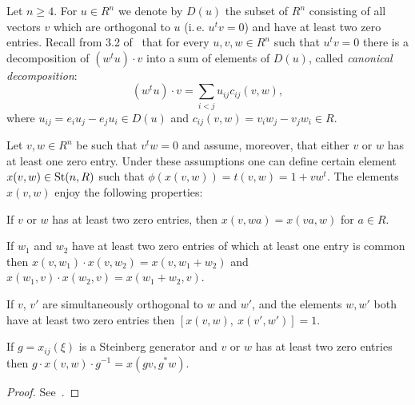 Let $n \geq 4$.
For $u \in R^n$ we denote by $D(u)$ the subset of $R^n$ consisting of all vectors $v$ which are orthogonal to $u$
(i.\,e. $u^{t} v = 0$) and have at least two zero entries.
Recall from 3.2 of~\cite{Ka77} that for every $u, v, w \in R^n$ such that $u^t v = 0$ there
is a decomposition of $(w^t u) \cdot v$ into a sum of elements of $D(u)$, called \textit{canonical decomposition}:
\begin{equation}
    \label{eq:canonical} (w^tu) \cdot v=\sum_{i<j}u_{ij} c_{ij}(v, w),
\end{equation}
where $u_{ij} =e_i u_j-e_j u_i \in D(u)$ and $c_{ij}(v, w) =v_i w_j-v_j w_i \in R$.

\begin{lemma}
    \label{lem:xsmall-properties}
    Let $v, w \in R^n$ be such that $v^t w = 0$ and assume, moreover, that either $v$ or $w$ has at least one zero entry.
    Under these assumptions one can define certain element $x(v, w) \in \operatorname{St}(n, R)$ such that $\phi(x(v, w)) = t(v, w) = 1 + vw^t$.
    The elements $x(v, w)$ enjoy the following properties:
    \begin{lemlist}
        \item \label{itm:xsmall-scalar} If $v$ or $w$ has at least two zero entries, then $x(v, wa) = x(va, w)$ for $a\in R$.
        \item \label{itm:xsmall-additivity} If $w_1$ and $w_2$ have at least two zero entries of which at least one entry is common
        then $x(v, w_1) \cdot x(v, w_2) = x(v, w_1+w_2)$ and $x(w_1, v) \cdot x(w_2, v) = x(w_1 + w_2, v)$.
        \item \label{itm:xsmall-commute} If $v$, $v'$ are simultaneously orthogonal to $w$ and $w'$, and the elements $w, w'$ both have at least two zero entries then
        $[x(v, w),\ x(v', w')] = 1$.
        \item \label{itm:xsmall-conj} If $g = x_{ij}(\xi)$ is a Steinberg generator and $v$ or $w$ has at least two zero entries then
        $g \cdot x(v, w) \cdot g^{-1} = x(gv, g^*w)$.
    \end{lemlist}
\end{lemma}
\begin{proof}
    See~\cite[Lemma~1.1]{Tu83}.
\end{proof}


